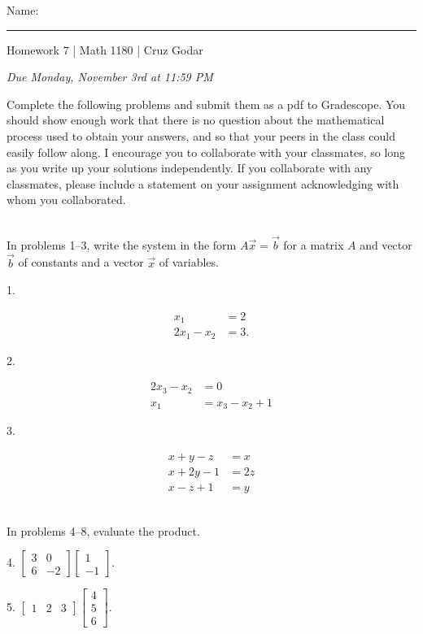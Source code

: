 \documentclass{article}
\begin{document}
\Large Name: \rule{2in}{0.15mm} \hfill Homework 7 | Math 1180 | Cruz Godar \vspace{4pt}  \normalsize

\textit{Due Monday, November 3rd at 11:59 PM}

Complete the following problems and submit them as a pdf to Gradescope. You should show enough work that there is no question about the mathematical process used to obtain your answers, and so that your peers in the class could easily follow along. I encourage you to collaborate with your classmates, so long as you write up your solutions independently. If you collaborate with any classmates, please include a statement on your assignment acknowledging with whom you collaborated.

~\\

In problems 1--3, write the system in the form $A\vec{x} = \vec{b}$ for a matrix $A$ and vector $\vec{b}$ of constants and a vector $\vec{x}$ of variables.

1.

\begin{align*}
	x_1 &= 2\\
	2x_1 - x_2 &= 3.
\end{align*}

2.

\begin{align*}
	2x_3 - x_2 &= 0\\
	x_1 &= x_3 - x_2 + 1
\end{align*}

3.

\begin{align*}
	x + y - z &= x\\
	x + 2y - 1 &= 2z\\
	x - z + 1 &= y
\end{align*}

~\\

In problems 4--8, evaluate the product.

4. $\displaystyle \left[\begin{array}{cc}3& 0 \\ 6& -2\end{array}\right]\left[\begin{array}{c}1 \\ -1\end{array}\right].$

5. $\displaystyle \left[\begin{array}{ccc}1& 2& 3\end{array}\right]\left[\begin{array}{c}4 \\ 5 \\ 6\end{array}\right].$
\end{document}
